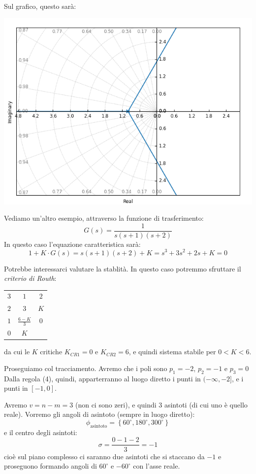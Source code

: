 \documentclass[a4paper,11pt]{article}
\begin{document}
\begin{enumerate}
	Sul grafico, questo sarà:
	\begin{center}
		\includegraphics[scale=0.8]{../figures/rlocus/1331.png}
	\end{center}

		\par\medskip
		\noindent
		\textbf{}

		Vediamo un'altro esempio, attraverso la funzione di trasferimento:
		$$
		G(s) = \frac{1}{s(s + 1)(s + 2)}
		$$
		In questo caso l'equazione caratteristica sarà:
		$$
		1 + K \cdot G(s) = s ( s + 1) ( s + 2) + K = s^3 + 3s^2 + 2s + K = 0
		$$

		Potrebbe interessarci valutare la stablità.
		In questo caso potremmo sfruttare il \textit{criterio di Routh}:
		\begin{table}[H]
			\center 
			\begin{tabular} { c | c c}
				$3$ & $1$ & $2$ \\
				$2$ & $3$ & $K$ \\
				$1$ & $\frac{6 - K}{3}$ & $0$ \\
				$0$ & $K$
			\end{tabular}
		\end{table}
		da cui le $K$ critiche $K_{CR1} = 0$ e $K_{CR2} = 6$, e quindi sistema stabile per $0 < K < 6$.

		Proseguiamo col tracciamento.
		Avremo che i poli sono $p_1 = -2$, $p_2 = -1$ e $p_3 = 0$
		Dalla regola (4), quindi, apparterranno al luogo diretto i punti in $(-\infty, -2]$, e i punti in $[-1, 0]$.

		Avremo $v = n - m = 3$ (non ci sono zeri), e quindi 3 asintoti (di cui uno è quello reale).
		Vorremo gli angoli di asintoto (sempre in luogo diretto):
		$$
		\phi_\text{asintoto} = \left\{ 60^\circ, 180^\circ, 300^\circ \right\}
		$$
		e il centro degli asintoti:
		$$
		\sigma = \frac{0 -1 -2}{3} = -1
		$$
		cioè sul piano complesso ci saranno due asintoti che si staccano da $-1$ e proseguono formando angoli di $60^\circ$ e $-60^\circ$ con l'asse reale. 


\end{enumerate}
\end{document}
